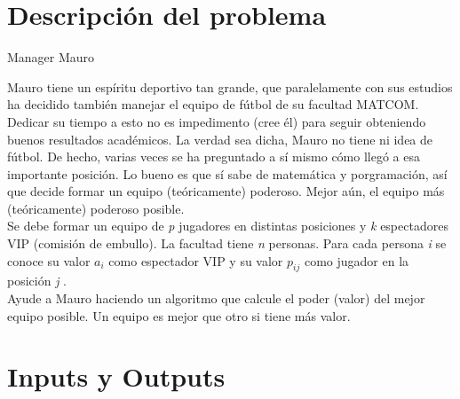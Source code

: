 \documentclass[sn-mathphys,Numbered]{sn-jnl}%
\theoremstyle{thmstyleone}%
\theoremstyle{thmstyletwo}%
\theoremstyle{thmstylethree}%
\begin{document}


\maketitle

\section{Descripci\'on del problema}\label{sec1}

\begin{center}
    Manager Mauro
\end{center} 

Mauro tiene un espíritu deportivo tan grande, que paralelamente con sus estudios ha decidido también manejar el equipo de fútbol de su facultad MATCOM. Dedicar su tiempo a esto no es impedimento (cree él) para seguir obteniendo buenos resultados académicos. La verdad sea dicha, Mauro no tiene ni idea de fútbol. De hecho, varias veces se ha preguntado a sí mismo cómo llegó a esa importante posición. Lo bueno es que sí sabe de matemática y porgramación, así que decide formar un equipo (teóricamente) poderoso. Mejor aún, el equipo más (teóricamente) poderoso posible.\\

Se debe formar un equipo de \textit{p}
 jugadores en distintas posiciones y \textit{k}
 espectadores VIP (comisión de embullo). La facultad tiene \textit{n} 
 personas. Para cada persona \textit{i}
 se conoce su valor $ a_i$
 como espectador VIP y su valor $p_{ij}$
 como jugador en la posición \textit{j}
.\\

Ayude a Mauro haciendo un algoritmo que calcule el poder (valor) del mejor equipo posible. Un equipo es mejor que otro si tiene más valor.

\section{Inputs y Outputs }\label{sec2}
\end{document}
